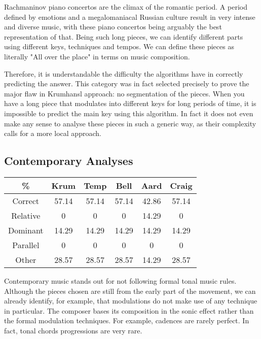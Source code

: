 Rachmaninov piano concertos are the climax of the romantic period.
A period defined by emotions and a megalomaniacal Russian culture result in very intense and diverse music,
with these piano concertos being arguably the best representation of that.
Being such long pieces, we can identify different parts using different keys, techniques and tempos.
We can define these pieces as literally "All over the place" in terms on music composition.

Therefore, it is understandable the difficulty the algorithms have in correctly predicting the answer.
This category was in fact selected precisely to prove the major flaw in Krumhansl approach: no segmentation of the pieces.
When you have a long piece that modulates into different keys for long periods of time, it is impossible to predict the main key using this algorithm.
In fact it does not even make any sense to analyse these pieces in such a generic way, as their complexity calls for a more local approach.


\subsection{Contemporary Analyses} \label{sec:contemp}

\begin{center}
    \begin{tabular}{|c||c c c c c||} 
    \hline
    \% & Krum & Temp & Bell & Aard & Craig \\
    \hline\hline
    Correct & 57.14 & 57.14 & 57.14 & 42.86 & 57.14\\ 
    \hline
    Relative & 0 & 0 & 0 & 14.29 & 0\\
    \hline
    Dominant & 14.29 & 14.29 & 14.29 & 14.29 & 14.29\\
    \hline
    Parallel & 0 & 0 & 0 & 0 & 0\\
    \hline
    Other & 28.57 & 28.57 & 28.57 & 14.29 & 28.57\\
    \hline
   \end{tabular}
\end{center}

Contemporary music stands out for not following formal tonal music rules.
Although the pieces chosen are still from the early part of the movement, we can already identify, for example, that modulations do not make use of any technique in particular.
The composer bases its composition in the sonic effect rather than the formal modulation techniques.
For example, cadences are rarely perfect. In fact, tonal chords progressions are very rare.

